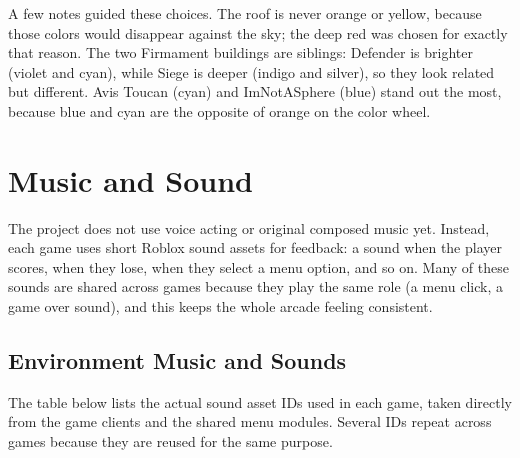 \documentclass[12pt,letterpaper]{article}
\begin{document}
A few notes guided these choices. The roof is never orange or yellow, because those colors would disappear against the sky; the deep red was chosen for exactly that reason. The two Firmament buildings are siblings: Defender is brighter (violet and cyan), while Siege is deeper (indigo and silver), so they look related but different. Avis Toucan (cyan) and ImNotASphere (blue) stand out the most, because blue and cyan are the opposite of orange on the color wheel.

\section{Music and Sound}

The project does not use voice acting or original composed music yet. Instead, each game uses short Roblox sound assets for feedback: a sound when the player scores, when they lose, when they select a menu option, and so on. Many of these sounds are shared across games because they play the same role (a menu click, a game over sound), and this keeps the whole arcade feeling consistent.

\subsection{Environment Music and Sounds}

The table below lists the actual sound asset IDs used in each game, taken directly from the game clients and the shared menu modules. Several IDs repeat across games because they are reused for the same purpose.
\end{document}
